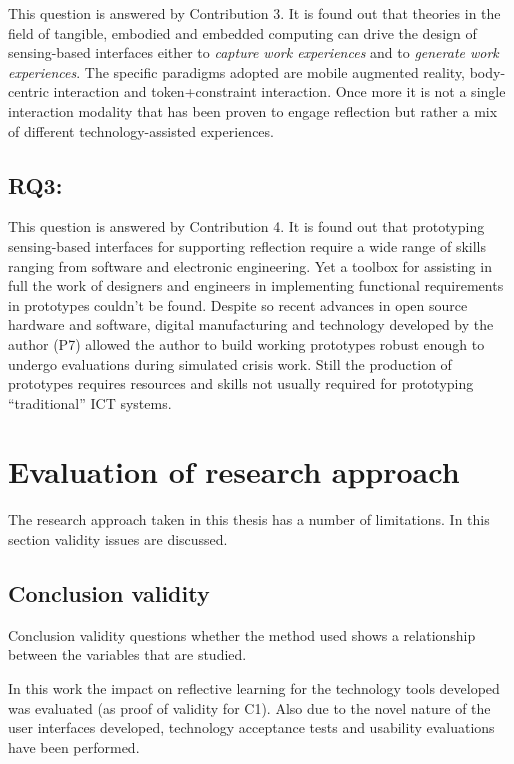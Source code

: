 This question is answered by Contribution 3. It is found out that theories in the field of tangible, embodied and embedded computing can drive the design of sensing-based interfaces either to \emph{capture work experiences} and to \emph{generate work experiences}. The specific paradigms adopted are mobile augmented reality, body-centric interaction and token+constraint interaction. Once more it is not a single interaction modality that has been proven to engage reflection but rather a mix of different technology-assisted experiences.

\subsection{RQ3: \RQiii}\label{rq3}

This question is answered by Contribution 4. It is found out that prototyping sensing-based interfaces for supporting reflection require a wide range of skills ranging from software and electronic engineering. Yet a toolbox for assisting in full the work of designers and engineers in implementing functional requirements in prototypes couldn't be found. Despite so recent advances in open source hardware and software, digital manufacturing and technology developed by the author (P7) allowed the author to build working prototypes robust enough to undergo evaluations during simulated crisis work. Still the production of prototypes requires resources and skills not usually required for prototyping ``traditional'' ICT systems.

\section{Evaluation of research approach}\label{evaluation-of-research-approach}

The research approach taken in this thesis has a number of limitations. In this section validity issues are discussed.

\subsection{Conclusion validity}\label{conclusion-validity}

Conclusion validity questions whether the method used shows a relationship between the variables that are studied.

In this work the impact on reflective learning for the technology tools developed was evaluated (as proof of validity for C1). Also due to the novel nature of the user interfaces developed, technology acceptance tests and usability evaluations have been performed.

